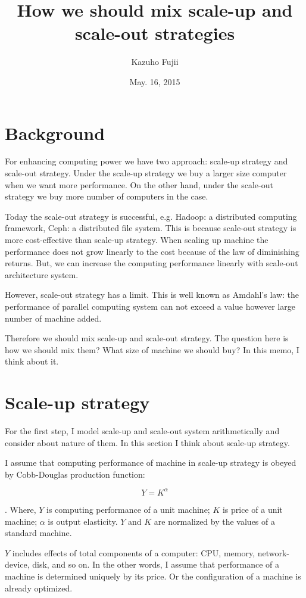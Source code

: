 \documentclass[a4paper,11pt]{article}
\title{How we should mix scale-up and scale-out strategies}
\author{Kazuho Fujii}
\date{May. 16, 2015}
\begin{document}
\maketitle

\section{Background}

For enhancing computing power we have two approach: scale-up strategy and 
scale-out strategy. Under the scale-up strategy we buy a larger size computer
when we want more performance. On the other hand, under the scale-out strategy
 we buy more number of computers in the case.

Today the scale-out strategy is successful, e.g. Hadoop: a distributed
computing framework, Ceph: a distributed file system. This is because 
scale-out strategy is more cost-effective than scale-up strategy. When scaling 
up machine the performance does not grow linearly to the cost because of the law
of diminishing returns. But, we can increase the computing performance linearly
with scale-out architecture system.

However, scale-out strategy has a limit. This is well known as Amdahl's law: the
performance of parallel computing system can not exceed a value however large
number of machine added.

Therefore we should mix scale-up and scale-out strategy. The question here is
how we should mix them? What size of machine we should buy? In this memo, I
think about it.

\section{Scale-up strategy}

For the first step, I model scale-up and scale-out system arithmetically and
consider about nature of them. In this section I think about scale-up strategy.

I assume that computing performance of machine in scale-up strategy is obeyed
by Cobb-Douglas production function:

$$
Y = K^\alpha
$$

. Where, $Y$ is computing performance of a unit machine;
$K$ is price of a unit machine; $\alpha$ is output elasticity.
$Y$ and $K$ are normalized by the values of a standard machine.

$Y$ includes effects of total components of a computer: CPU, memory, network-device, disk, and so on.
In the other words, I assume that performance of a machine is determined uniquely by its price.
Or the configuration of a machine is already optimized. 
\end{document}
